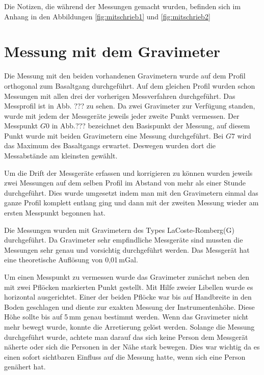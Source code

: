 Die Notizen, die während der Messungen gemacht wurden, befinden sich im Anhang in den Abbildungen \ref{fig:mitschrieb1} und \ref{fig:mitschrieb2}

\section{Messung mit dem Gravimeter}

Die Messung mit den beiden vorhandenen Gravimetern wurde auf dem Profil orthogonal zum Basaltgang durchgeführt. Auf dem gleichen Profil wurden schon Messungen mit allen drei der vorherigen Messverfahren durchgeführt.
Das Messprofil ist in Abb. ??? zu sehen. Da zwei Gravimeter zur Verfügung standen, wurde mit jedem der Messgeräte jeweils jeder zweite Punkt vermessen. Der Messpunkt $G0$ in Abb.??? bezeichnet den Basispunkt der Messung, auf
diesem Punkt wurde mit beiden Gravimetern eine Messung durchgeführt. Bei $G7$ wird das Maximum des Basaltgangs erwartet. Deswegen wurden dort die Messabstände am kleinsten gewählt.

Um die Drift der Messgeräte erfassen und korrigieren zu können wurden jeweils zwei Messungen auf dem selben Profil im Abstand von mehr als einer Stunde durchgeführt. Dies wurde umgesetzt indem man mit den Gravimetern 
einmal das ganze Profil komplett entlang ging und dann mit der zweiten Messung wieder am ersten Messpunkt begonnen hat.

Die Messungen wurden mit Gravimetern des Types LaCoste-Romberg(G) durchgeführt. Da Gravimeter sehr empfindliche Messgeräte sind mussten die Messungen sehr genau und vorsichtig durchgeführt werden. Das Messgerät hat eine 
theoretische Auflösung von 0,01\,mGal.

Um einen Messpunkt zu vermessen wurde das Gravimeter zunächst neben den mit zwei Pflöcken markierten Punkt gestellt. Mit Hilfe zweier Libellen wurde es horizontal ausgerichtet. Einer der beiden Pflöcke 
war bis auf Handbreite in den Boden geschlagen und diente zur exakten Messung der Instrumentenhöhe. Diese Höhe sollte bis auf 5\,mm genau bestimmt werden.
Wenn das Gravimeter nicht mehr bewegt wurde, konnte die Arretierung gelöst werden. Solange die Messung durchgeführt wurde, achtete man darauf das sich keine Person dem Messgerät näherte oder sich die Personen in der 
Nähe stark bewegen. Dies war wichtig da es einen sofort sichtbaren Einfluss auf die Messung hatte, wenn sich eine Person genähert hat.

